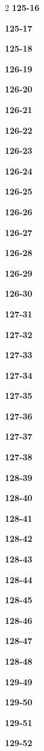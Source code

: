 \documentclass[10pt,a4paper]{article}
\begin{document}
\begin{multicols}{2}
\noindent\textbf{125-16}\ \par
\noindent\textbf{125-17}\ \par
\noindent\textbf{125-18}\ \par
\noindent\textbf{126-19}\ \par
\noindent\textbf{126-20}\ \par
\noindent\textbf{126-21}\ \par
\noindent\textbf{126-22}\ \par
\noindent\textbf{126-23}\ \par
\noindent\textbf{126-24}\ \par
\noindent\textbf{126-25}\ \par
\noindent\textbf{126-26}\ \par
\noindent\textbf{126-27}\ \par
\noindent\textbf{126-28}\ \par
\noindent\textbf{126-29}\ \par
\noindent\textbf{126-30}\ \par
\noindent\textbf{127-31}\ \par
\noindent\textbf{127-32}\ \par
\noindent\textbf{127-33}\ \par
\noindent\textbf{127-34}\ \par
\noindent\textbf{127-35}\ \par
\noindent\textbf{127-36}\ \par
\noindent\textbf{127-37}\ \par
\noindent\textbf{127-38}\ \par
\noindent\textbf{128-39}\ \par
\noindent\textbf{128-40}\ \par
\noindent\textbf{128-41}\ \par
\noindent\textbf{128-42}\ \par
\noindent\textbf{128-43}\ \par
\noindent\textbf{128-44}\ \par
\noindent\textbf{128-45}\ \par
\noindent\textbf{128-46}\ \par
\noindent\textbf{128-47}\ \par
\noindent\textbf{128-48}\ \par
\noindent\textbf{129-49}\ \par
\noindent\textbf{129-50}\ \par
\noindent\textbf{129-51}\ \par
\noindent\textbf{129-52}\ \par

\end{multicols}
\end{document}
